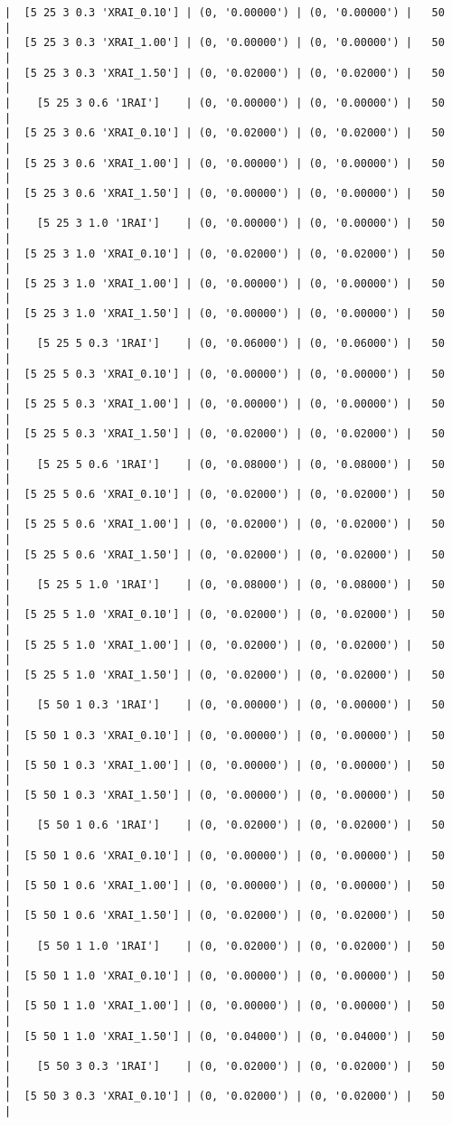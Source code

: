 \documentclass{article}
\begin{document}
\begin{verbatim}
|  [5 25 3 0.3 'XRAI_0.10'] | (0, '0.00000') | (0, '0.00000') |   50  |
|  [5 25 3 0.3 'XRAI_1.00'] | (0, '0.00000') | (0, '0.00000') |   50  |
|  [5 25 3 0.3 'XRAI_1.50'] | (0, '0.02000') | (0, '0.02000') |   50  |
|    [5 25 3 0.6 '1RAI']    | (0, '0.00000') | (0, '0.00000') |   50  |
|  [5 25 3 0.6 'XRAI_0.10'] | (0, '0.02000') | (0, '0.02000') |   50  |
|  [5 25 3 0.6 'XRAI_1.00'] | (0, '0.00000') | (0, '0.00000') |   50  |
|  [5 25 3 0.6 'XRAI_1.50'] | (0, '0.00000') | (0, '0.00000') |   50  |
|    [5 25 3 1.0 '1RAI']    | (0, '0.00000') | (0, '0.00000') |   50  |
|  [5 25 3 1.0 'XRAI_0.10'] | (0, '0.02000') | (0, '0.02000') |   50  |
|  [5 25 3 1.0 'XRAI_1.00'] | (0, '0.00000') | (0, '0.00000') |   50  |
|  [5 25 3 1.0 'XRAI_1.50'] | (0, '0.00000') | (0, '0.00000') |   50  |
|    [5 25 5 0.3 '1RAI']    | (0, '0.06000') | (0, '0.06000') |   50  |
|  [5 25 5 0.3 'XRAI_0.10'] | (0, '0.00000') | (0, '0.00000') |   50  |
|  [5 25 5 0.3 'XRAI_1.00'] | (0, '0.00000') | (0, '0.00000') |   50  |
|  [5 25 5 0.3 'XRAI_1.50'] | (0, '0.02000') | (0, '0.02000') |   50  |
|    [5 25 5 0.6 '1RAI']    | (0, '0.08000') | (0, '0.08000') |   50  |
|  [5 25 5 0.6 'XRAI_0.10'] | (0, '0.02000') | (0, '0.02000') |   50  |
|  [5 25 5 0.6 'XRAI_1.00'] | (0, '0.02000') | (0, '0.02000') |   50  |
|  [5 25 5 0.6 'XRAI_1.50'] | (0, '0.02000') | (0, '0.02000') |   50  |
|    [5 25 5 1.0 '1RAI']    | (0, '0.08000') | (0, '0.08000') |   50  |
|  [5 25 5 1.0 'XRAI_0.10'] | (0, '0.02000') | (0, '0.02000') |   50  |
|  [5 25 5 1.0 'XRAI_1.00'] | (0, '0.02000') | (0, '0.02000') |   50  |
|  [5 25 5 1.0 'XRAI_1.50'] | (0, '0.02000') | (0, '0.02000') |   50  |
|    [5 50 1 0.3 '1RAI']    | (0, '0.00000') | (0, '0.00000') |   50  |
|  [5 50 1 0.3 'XRAI_0.10'] | (0, '0.00000') | (0, '0.00000') |   50  |
|  [5 50 1 0.3 'XRAI_1.00'] | (0, '0.00000') | (0, '0.00000') |   50  |
|  [5 50 1 0.3 'XRAI_1.50'] | (0, '0.00000') | (0, '0.00000') |   50  |
|    [5 50 1 0.6 '1RAI']    | (0, '0.02000') | (0, '0.02000') |   50  |
|  [5 50 1 0.6 'XRAI_0.10'] | (0, '0.00000') | (0, '0.00000') |   50  |
|  [5 50 1 0.6 'XRAI_1.00'] | (0, '0.00000') | (0, '0.00000') |   50  |
|  [5 50 1 0.6 'XRAI_1.50'] | (0, '0.02000') | (0, '0.02000') |   50  |
|    [5 50 1 1.0 '1RAI']    | (0, '0.02000') | (0, '0.02000') |   50  |
|  [5 50 1 1.0 'XRAI_0.10'] | (0, '0.00000') | (0, '0.00000') |   50  |
|  [5 50 1 1.0 'XRAI_1.00'] | (0, '0.00000') | (0, '0.00000') |   50  |
|  [5 50 1 1.0 'XRAI_1.50'] | (0, '0.04000') | (0, '0.04000') |   50  |
|    [5 50 3 0.3 '1RAI']    | (0, '0.02000') | (0, '0.02000') |   50  |
|  [5 50 3 0.3 'XRAI_0.10'] | (0, '0.02000') | (0, '0.02000') |   50  |

\end{verbatim}
\end{document}
